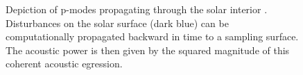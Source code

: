 \documentclass[11pt,a4paper,onecolumn]{report}
\begin{document}
\begin{figure}[t]%
  \centering
  \qquad
  \caption[]{ Depiction of p-modes propagating through the solar
    interior \citep{Lindsey2017}.  Disturbances on the solar surface (dark blue) can be
    computationally propagated backward in time to a sampling surface. The
    acoustic power is then given by the squared magnitude of this coherent
    acoustic egression.\citep{Lindsey2011} }
\end{figure}
\end{document}
